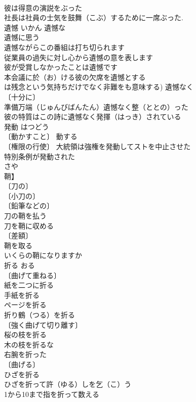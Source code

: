 \documentclass[8pt]{extreport}
\begin{document}
\begin{CJK}{UTF8}{min}
\\	彼は得意の演説をぶった 
\\	社長は社員の士気を鼓舞（こぶ）するために一席ぶった. 
\\	遺憾	いかん	遺憾な 
\\	遺憾に思う 
\\	遺憾ながらこの番組は打ち切られます 
\\	従業員の過失に対し心から遺憾の意を表します 
\\	彼が受賞しなかったことは遺憾です 
\\	本会議に於（お）ける彼の欠席を遺憾とする 
\\	は残念という気持ちだけでなく非難をも意味する) 遺憾なく 
\\	〔十分に〕
\\	準備万端（じゅんびばんたん）遺憾なく整（ととの）った 
\\	彼の特質はこの詩に遺憾なく発揮（はっき）されている 
\\	発動	はつどう	
\\	〔動かすこと〕 動する 
\\	〔権限の行使〕 大統領は強権を発動してストを中止させた 
\\	特別条例が発動された 
\\	さや	
\\	鞘】	
\\	〔刀の〕
\\	〔小刀の〕
\\	〔鉛筆などの〕
\\	刀の鞘を払う 
\\	刀を鞘に収める 
\\	〔差額〕　
\\	鞘を取る 
\\	いくらの鞘になりますか 
\\	折る	おる	
\\	〔曲げて重ねる〕
\\	紙を二つに折る 
\\	手紙を折る 
\\	ページを折る 
\\	折り鶴（つる）を折る 
\\	〔強く曲げて切り離す〕
\\	桜の枝を折る 
\\	木の枝を折るな 
\\	右腕を折った 
\\	〔曲げる〕
\\	ひざを折る 
\\	ひざを折って許（ゆる）しを乞（こ）う 
\\	1から10まで指を折って数える 

\end{CJK}
\end{document}
